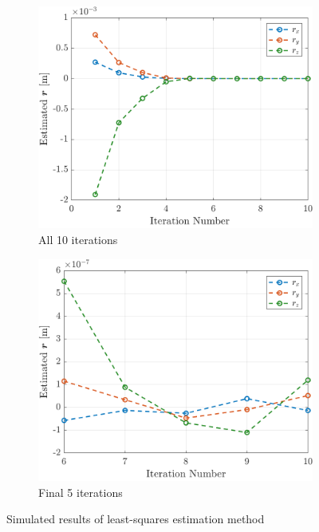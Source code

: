 \begin{figure}[h]
  \centering
  \begin{subfigure}[t]{0.47\textwidth}
    \includegraphics[width=\linewidth]{plots/LSR_sim_all_runs.png}
    \caption{All 10 iterations}\label{fig:LSR_sim_runs_a}
  \end{subfigure}\hfill
  \begin{subfigure}[t]{0.47\textwidth}
    \includegraphics[width=\linewidth]{plots/LSR_sim_last_5_runs.png}
    \caption{Final 5 iterations}\label{fig:LSR_sim_runs_b}
  \end{subfigure}
  \caption{Simulated results of least-squares estimation method}
  \label{fig:LSR_sim_runs}
\end{figure}

